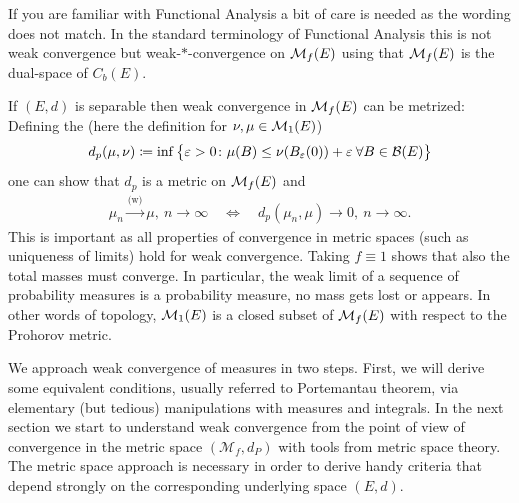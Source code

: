 If you are familiar with Functional Analysis a bit of care is needed as the wording does not match. In the standard terminology of Functional Analysis this is not weak convergence but weak-$*$-convergence on $\mathcal{M}_f(E)$ using that $\mathcal{M}_f(E)$ is the dual-space of $C_b(E)$.
\begin{lstep}
\begin{remark}
			If $(E,d)$ is separable then weak convergence in $\mathcal{M}_f(E)$ can be metrized: Defining the \textbf{} (here the definition for $\nu,\mu\in \mathcal{M}_1(E)$)
			\begin{align*}
				d_p(\mu,\nu) \coloneqq \inf \big\{ \varepsilon >0 \colon \mu (B) \leq \nu (B_{\varepsilon}(0)) + \varepsilon \:\forall B\in \mathcal{B}(E) \big\}
			\end{align*}
			one can show that $d_p$ is a metric on $\mathcal{M}_f(E)$ and
			\begin{align*}
				\mu_n \overset{\text{(w)}}{\longrightarrow}\mu, \: n \to \infty \quad\Leftrightarrow \quad d_p(\mu_n,\mu) \to 0, \: n\to \infty.
			\end{align*}
			This is important as all properties of convergence in  metric spaces (such as uniqueness of limits) hold for weak convergence. Taking $f \equiv 1$ shows that also the total masses must converge. In particular, the weak limit of a sequence of probability measures is a probability measure, no mass gets lost or appears. In other words of topology, $\mathcal{M}_1(E)$ is a closed subset of $\mathcal{M}_f(E)$ with respect to the Prohorov metric.

\end{remark}
\end{lstep}
	\marginpar{\textcolor{red}{Lecture 12}}
We approach weak convergence of measures in two steps. First, we will derive some equivalent conditions, usually referred to Portemantau theorem, via elementary (but tedious) manipulations with measures and integrals. In the next section we start to understand weak convergence from the point of view of convergence in the metric space $(\mathcal M_f,d_P)$ with tools from metric space theory. The metric space approach is necessary in order to derive handy criteria that depend strongly on the corresponding underlying space $(E,d)$.\smallskip

